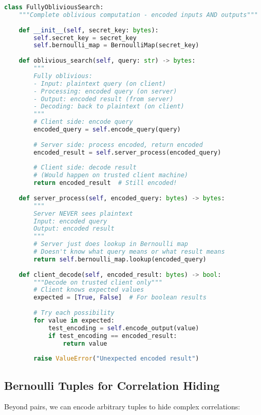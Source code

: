 \begin{lstlisting}[language=Python, caption={Fully oblivious search system}]
class FullyObliviousSearch:
    """Complete oblivious computation - encoded inputs AND outputs"""
    
    def __init__(self, secret_key: bytes):
        self.secret_key = secret_key
        self.bernoulli_map = BernoulliMap(secret_key)
        
    def oblivious_search(self, query: str) -> bytes:
        """
        Fully oblivious: 
        - Input: plaintext query (on client)
        - Processing: encoded query (on server) 
        - Output: encoded result (from server)
        - Decoding: back to plaintext (on client)
        """
        # Client side: encode query
        encoded_query = self.encode_query(query)
        
        # Server side: process encoded, return encoded
        encoded_result = self.server_process(encoded_query)
        
        # Client side: decode result
        # (Would happen on trusted client machine)
        return encoded_result  # Still encoded!
    
    def server_process(self, encoded_query: bytes) -> bytes:
        """
        Server NEVER sees plaintext
        Input: encoded query
        Output: encoded result
        """
        # Server just does lookup in Bernoulli map
        # Doesn't know what query means or what result means
        return self.bernoulli_map.lookup(encoded_query)
    
    def client_decode(self, encoded_result: bytes) -> bool:
        """Decode on trusted client only"""
        # Client knows expected values
        expected = [True, False]  # For boolean results
        
        # Try each possibility
        for value in expected:
            test_encoding = self.encode_output(value)
            if test_encoding == encoded_result:
                return value
        
        raise ValueError("Unexpected encoded result")
\end{lstlisting}

\subsection{Bernoulli Tuples for Correlation Hiding}

Beyond pairs, we can encode arbitrary tuples to hide complex correlations:

